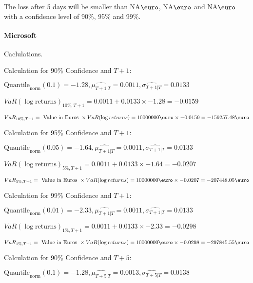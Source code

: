 The loss after 5 days will be smaller than NA$\text{\euro}$, NA$\text{\euro}$  and NA$\text{\euro}$  with a confidence level of 90\%, 95\%  and 99\%.


\paragraph{Microsoft} Caclulations.\newline \indent 




Calculation for 90\% Confidence and $T+1$:

\indent\indent $\text{Quantile}_\text{norm}(0.1) = -1.28,\hat{\mu_{T+1|T}} = 0.0011, \hat{\sigma_{T+1|T}} = 0.0133$

\indent\indent $VaR(\log \text{returns})_{10\%, T + 1} = 0.0011 + 0.0133\times-1.28 = -0.0159$

\indent\indent $VaR_{10\%, T + 1} = \text{ Value in Euros } \times VaR(\log returns) = 10 000 000 \text{\euro} \times-0.0159 = -159257.48 \text{\euro}$\newline




Calculation for 95\% Confidence and $T+1$:

\indent\indent $\text{Quantile}_\text{norm}(0.05) = -1.64,\hat{\mu_{T+1|T}} = 0.0011, \hat{\sigma_{T+1|T}} = 0.0133$

\indent\indent $VaR(\log \text{returns})_{5\%, T + 1} = 0.0011 + 0.0133\times-1.64 = -0.0207$

\indent\indent $VaR_{5\%, T + 1} = \text{ Value in Euros } \times VaR(\log returns) = 10 000 000 \text{\euro} \times-0.0207 = -207448.05 \text{\euro}$\newline




Calculation for 99\% Confidence and $T+1$:

\indent\indent $\text{Quantile}_\text{norm}(0.01) = -2.33,\hat{\mu_{T+1|T}} = 0.0011, \hat{\sigma_{T+1|T}} = 0.0133$

\indent\indent $VaR(\log \text{returns})_{1\%, T + 1} = 0.0011 + 0.0133\times-2.33 = -0.0298$

\indent\indent $VaR_{1\%, T + 1} = \text{ Value in Euros } \times VaR(\log returns) = 10 000 000 \text{\euro} \times-0.0298 = -297845.55 \text{\euro}$\newline




Calculation for 90\% Confidence and $T+5$:

\indent\indent $\text{Quantile}_\text{norm}(0.1) = -1.28,\hat{\mu_{T+5|T}} = 0.0013, \hat{\sigma_{T+5|T}} = 0.0138$

